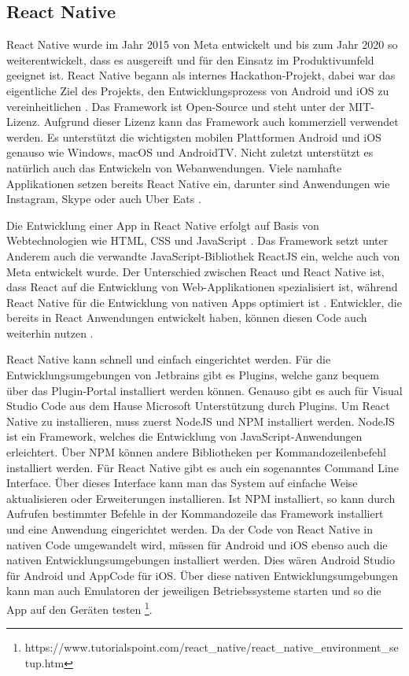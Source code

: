 \documentclass[]{lni}
\begin{document}
\subsection{React Native} \label{sec:ReactNative}
React Native wurde im Jahr 2015 von Meta entwickelt und bis zum Jahr 2020 so weiterentwickelt, dass es ausgereift und für den Einsatz im Produktivumfeld geeignet ist. React Native begann als internes Hackathon-Projekt, dabei war das eigentliche Ziel des Projekts, den Entwicklungsprozess von Android und iOS zu vereinheitlichen \cite{Niemeier.04.11.2022}. Das Framework ist Open-Source und steht unter der MIT-Lizenz. Aufgrund dieser Lizenz kann das Framework auch kommerziell verwendet werden. Es unterstützt die wichtigsten mobilen Plattformen Android und iOS genauso wie Windows, macOS und AndroidTV. Nicht zuletzt unterstützt es natürlich auch das Entwickeln von Webanwendungen. Viele namhafte Applikationen setzen bereits React Native ein, darunter sind Anwendungen wie Instagram, Skype oder auch Uber Eats \cite{Chandratre.28.01.2020}.

Die Entwicklung einer App in React Native erfolgt auf Basis von Webtechnologien wie HTML, CSS und JavaScript \cite{Zammetti.2019}. Das Framework setzt unter Anderem auch die verwandte JavaScript-Bibliothek ReactJS ein, welche auch von Meta entwickelt wurde. Der Unterschied zwischen React und React Native ist, dass React auf die Entwicklung von Web-Applikationen spezialisiert ist, während React Native für die Entwicklung von nativen Apps optimiert ist \cite{Lestal.12.08.2020}. Entwickler, die bereits in React Anwendungen entwickelt haben, können diesen Code auch weiterhin nutzen \cite{Krypczyk.2021}.

React Native kann schnell und einfach eingerichtet werden. Für die Entwicklungsumgebungen von Jetbrains gibt es Plugins, welche ganz bequem über das Plugin-Portal installiert werden können. Genauso gibt es auch für Visual Studio Code aus dem Hause Microsoft Unterstützung durch Plugins. Um React Native zu installieren, muss zuerst NodeJS und NPM installiert werden. NodeJS ist ein Framework, welches die Entwicklung von JavaScript-Anwendungen erleichtert. Über NPM können andere Bibliotheken per Kommandozeilenbefehl installiert werden. Für React Native gibt es auch ein sogenanntes Command Line Interface. Über dieses Interface kann man das System auf einfache Weise aktualisieren oder Erweiterungen installieren. Ist NPM installiert, so kann durch Aufrufen bestimmter Befehle in der Kommandozeile das Framework installiert und eine Anwendung eingerichtet werden. Da der Code von React Native in nativen Code umgewandelt wird, müssen für Android und iOS ebenso auch die nativen Entwicklungsumgebungen installiert werden. Dies wären Android Studio für Android und AppCode für iOS. Über diese nativen Entwicklungsumgebungen kann man auch Emulatoren der jeweiligen Betriebssysteme starten und so die App auf den Geräten testen \footnote{https://www.tutorialspoint.com/react\_native/react\_native\_environment\_setup.htm}.
\end{document}
